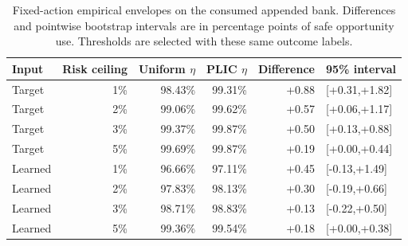 \begin{table}[h]
\centering\small
\caption{Fixed-action empirical envelopes on the consumed appended bank. Differences and pointwise bootstrap intervals are in percentage points of safe opportunity use. Thresholds are selected with these same outcome labels.}
\label{tab:matched}
\begin{tabular}{lrrrrl}
\toprule
Input & Risk ceiling & Uniform $\eta$ & PLIC $\eta$ & Difference & 95\% interval\\
\midrule
Target & 1\% & 98.43\% & 99.31\% & +0.88 & [+0.31,+1.82]\\
Target & 2\% & 99.06\% & 99.62\% & +0.57 & [+0.06,+1.17]\\
Target & 3\% & 99.37\% & 99.87\% & +0.50 & [+0.13,+0.88]\\
Target & 5\% & 99.69\% & 99.87\% & +0.19 & [+0.00,+0.44]\\
Learned & 1\% & 96.66\% & 97.11\% & +0.45 & [-0.13,+1.49]\\
Learned & 2\% & 97.83\% & 98.13\% & +0.30 & [-0.19,+0.66]\\
Learned & 3\% & 98.71\% & 98.83\% & +0.13 & [-0.22,+0.50]\\
Learned & 5\% & 99.36\% & 99.54\% & +0.18 & [+0.00,+0.38]\\
\bottomrule
\end{tabular}
\end{table}
